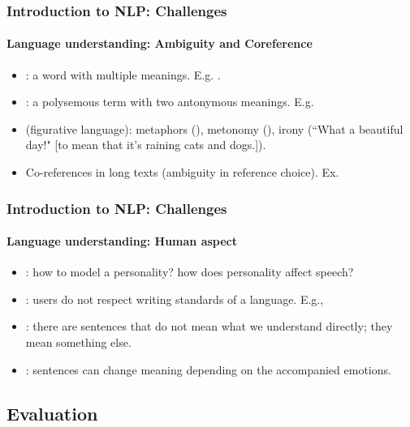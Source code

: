 \documentclass[xcolor=table]{beamer}
\begin{document}
\begin{frame}
\frametitle{Introduction to NLP: Challenges}
\framesubtitle{Language understanding: Ambiguity and Coreference}

\begin{itemize}
	\item {}: a word with multiple meanings.
	E.g. .
	\item {}: a polysemous term with two antonymous meanings.
	E.g. 
	\item {} (figurative language): metaphors (), metonomy (), irony (``What a beautiful day!" [to mean that it's raining cats and dogs.]).
	\item Co-references in long texts (ambiguity in reference choice).
	Ex. 
\end{itemize}

\end{frame}

\begin{frame}
\frametitle{Introduction to NLP: Challenges}
\framesubtitle{Language understanding: Human aspect}

\begin{itemize}
	\item {}: how to model a personality? how does personality affect speech?
	\item {}: users do not respect writing standards of a language. E.g., 
	\item {}: there are sentences that do not mean what we understand directly; they mean something else.
	\item {}: sentences can change meaning depending on the accompanied emotions.
\end{itemize}

\end{frame}


\subsection{Evaluation}
\end{document}
